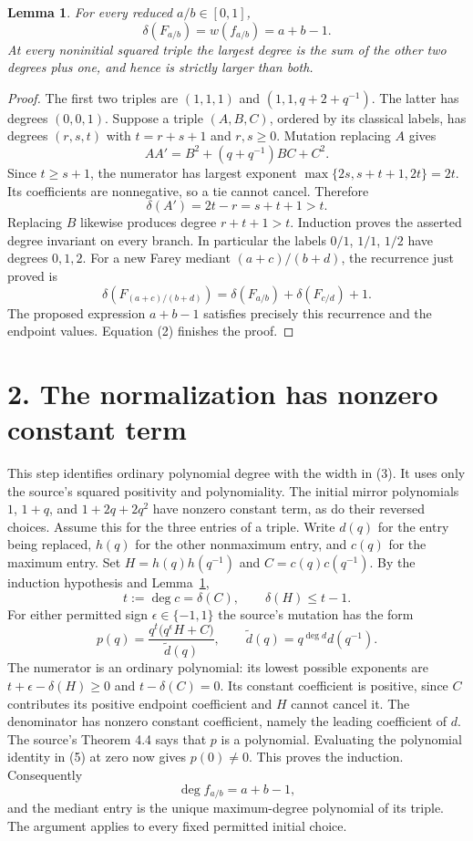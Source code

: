 \documentclass[11pt]{article}
\newtheorem{lemma}[theorem]{Lemma}
\begin{document}
\begin{lemma}\label{degree}
For every reduced $a/b\in[0,1]$,
\[
 \delta(F_{a/b})=w(f_{a/b})=a+b-1.                       \tag{3}
\]
At every noninitial squared triple the largest degree is the sum of the
other two degrees plus one, and hence is strictly larger than both.
\end{lemma}
\begin{proof}
The first two triples are $(1,1,1)$ and $(1,1,q+2+q^{-1})$.
The latter has degrees $(0,0,1)$. Suppose a triple $(A,B,C)$,
ordered by its classical labels, has degrees $(r,s,t)$ with
$t=r+s+1$ and $r,s\ge0$. Mutation replacing $A$ gives
\[
 AA'=B^2+(q+q^{-1})BC+C^2.                              \tag{4}
\]
Since $t\ge s+1$, the numerator has largest exponent
$\max\{2s,s+t+1,2t\}=2t$. Its coefficients are nonnegative,
so a tie cannot cancel. Therefore
\[
 \delta(A')=2t-r=s+t+1>t.
\]
Replacing $B$ likewise produces degree $r+t+1>t$.
Induction proves the asserted degree invariant on every branch.
In particular the labels $0/1$, $1/1$, $1/2$ have degrees $0,1,2$.
For a new Farey mediant $(a+c)/(b+d)$, the recurrence just proved is
\[
 \delta(F_{(a+c)/(b+d)})
 =\delta(F_{a/b})+\delta(F_{c/d})+1.
\]
The proposed expression $a+b-1$ satisfies precisely this recurrence and
the endpoint values. Equation (2) finishes the proof.
\end{proof}

\section*{2. The normalization has nonzero constant term}
This step identifies ordinary polynomial degree with the width in (3).
It uses only the source's squared positivity and polynomiality.
The initial mirror polynomials $1$, $1+q$, and $1+2q+2q^2$
have nonzero constant term, as do their reversed choices.
Assume this for the three entries of a triple. Write $d(q)$ for the
entry being replaced, $h(q)$ for the other nonmaximum entry, and
$c(q)$ for the maximum entry. Set
$H=h(q)h(q^{-1})$ and $C=c(q)c(q^{-1})$.
By the induction hypothesis and Lemma~\ref{degree},
\[
 t:=\deg c=\delta(C),\qquad \delta(H)\le t-1.
\]
For either permitted sign $\epsilon\in\{-1,1\}$ the source's
mutation has the form
\[
 p(q)=\frac{q^t\bigl(q^\epsilon H+C\bigr)}{\widetilde d(q)},
 \qquad \widetilde d(q)=q^{\deg d}d(q^{-1}).             \tag{5}
\]
The numerator is an ordinary polynomial: its lowest possible exponents
are $t+\epsilon-\delta(H)\ge0$ and $t-\delta(C)=0$.
Its constant coefficient is positive, since $C$ contributes its positive
endpoint coefficient and $H$ cannot cancel it.
The denominator has nonzero constant coefficient, namely the leading
coefficient of $d$. The source's Theorem 4.4 says that $p$ is a
polynomial. Evaluating the polynomial identity in (5) at zero now gives
$p(0)\ne0$. This proves the induction. Consequently
\[
 \deg f_{a/b}=a+b-1,                                    \tag{6}
\]
and the mediant entry is the unique maximum-degree polynomial of its
triple. The argument applies to every fixed permitted initial choice.
\end{document}
